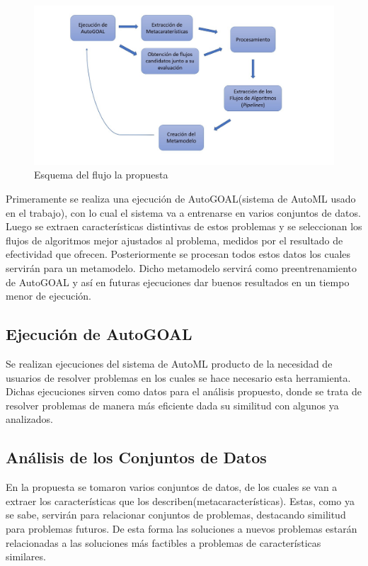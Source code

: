 \begin{figure}[H]
    \centering
    \includegraphics[scale=.5]{Figures/proposal-flow.jpg}
    \caption{Esquema del flujo la propuesta}
    \label{fig:prop-flow}
\end{figure}

Primeramente se realiza una ejecución de AutoGOAL(sistema de AutoML usado en el
trabajo), con lo cual el sistema va a entrenarse en varios conjuntos de datos.
Luego se extraen características distintivas de estos problemas y se
seleccionan los flujos de algoritmos mejor ajustados al problema, medidos por
el resultado de efectividad que ofrecen. Posteriormente se procesan todos estos
datos los cuales servirán para un metamodelo. Dicho metamodelo servirá como
preentrenamiento de AutoGOAL y así en futuras ejecuciones dar buenos
resultados en un tiempo menor de ejecución.



\subsection{Ejecución de AutoGOAL}

Se realizan ejecuciones del sistema de AutoML producto de la necesidad de
usuarios de resolver problemas en los cuales se hace necesario esta herramienta.
Dichas ejecuciones sirven como datos para el análisis propuesto, donde se trata
de resolver problemas de manera más eficiente dada su similitud con algunos ya
analizados. 

\subsection{Análisis de los Conjuntos de Datos}

En la propuesta se tomaron varios conjuntos de datos, de los cuales se van a
extraer los características que los describen(metacaracterísticas). Estas, como
ya se sabe, servirán para relacionar conjuntos de problemas, destacando
similitud para problemas futuros. De esta forma las soluciones a nuevos
problemas estarán relacionadas a las soluciones más factibles a problemas de
características similares. 

